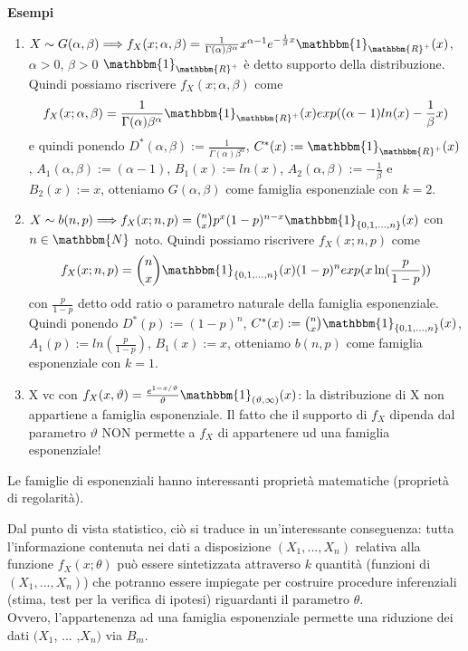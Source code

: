 \noindent \textbf{Esempi}
\begin{enumerate}
\item 
$X \sim G(\alpha, \beta) \Longrightarrow f_X(x; \alpha, \beta) = \frac{1}{\Gamma(\alpha) \beta^\alpha} x^{\alpha -1} e^{- \frac{1}{\beta} x} \mathbbm{1}_{\mathbbm{R}^+}(x)$, $\alpha >0$, $\beta >0$
$\mathbbm{1}_{\mathbbm{R}^+}$ è detto supporto della distribuzione.
Quindi possiamo riscrivere $f_X(x; \alpha, \beta)$ come
$$f_X(x; \alpha, \beta) = \frac{1}{\Gamma(\alpha) \beta^\alpha} \mathbbm{1}_{\mathbbm{R}^+}(x) exp((\alpha -1) ln(x) - \frac{1}{\beta} x)$$
e quindi ponendo $D^*(\alpha, \beta) := \frac{1}{\Gamma(\alpha) \beta^\alpha}$, $C^*(x) := \mathbbm{1}_{\mathbbm{R}^+}(x)$, $A_1(\alpha, \beta) := (\alpha -1)$, $B_1(x) := ln(x)$, $A_2(\alpha, \beta) := - \frac{1}{\beta}$ e $B_2(x) := x$, otteniamo $G(\alpha, \beta)$ come famiglia esponenziale con $k=2$.

\item $X \sim b(n,p) \Longrightarrow f_X(x; n,p) = \binom{n}{x} p^x (1-p)^{n-x} \mathbbm{1}_{\lbrace 0,1,...,n \rbrace}(x)$ con $n \in \mathbbm{N}$ noto.
Quindi possiamo riscrivere $f_X(x; n,p)$ come
$$f_X(x; n,p) = \binom{n}{x} \mathbbm{1}_{\lbrace 0,1,...,n \rbrace}(x) (1-p)^n exp(x \ln(\frac{p}{1-p}))$$ con $\frac{p}{1-p}$ detto odd ratio o parametro naturale della famiglia esponenziale.\\
Quindi ponendo $D^*(p) := (1-p)^n$, $C^*(x) := \binom{n}{x} \mathbbm{1}_{\lbrace 0,1,...,n \rbrace}(x)$, $A_1(p) := ln(\frac{p}{1-p})$, $B_1(x) := x$, otteniamo $b(n,p)$ come famiglia esponenziale con $k=1$.

\item X vc con $f_X(x,\vartheta)=\frac{e^{1-x/\vartheta}}{\vartheta}\mathbbm{1}_{(\vartheta,\infty)}(x)$: la distribuzione di X non appartiene a famiglia esponenziale.
Il fatto che il supporto di $f_X$ dipenda dal parametro $\vartheta$ NON permette a $f_X$ di appartenere ud una famiglia esponenziale!
\end{enumerate}

\begin{oss}
Le famiglie di esponenziali hanno interessanti proprietà matematiche (proprietà di regolarità).

Dal punto di vista statistico, ciò si traduce in un'interessante conseguenza: tutta l'informazione contenuta nei dati a disposizione $(X_1,...,X_n)$ relativa alla funzione $f_X (x; \theta)$ può essere sintetizzata attraverso $k$ quantità (funzioni di $(X_1,...,X_n)$) che potranno essere impiegate per costruire procedure inferenziali (stima, test per la verifica di ipotesi) riguardanti il parametro $\theta$.\\
Ovvero, l'appartenenza ad una famiglia esponenziale permette una riduzione dei dati $(X_1$, ... ,$X_n)$ via $B_m$.
\end{oss}